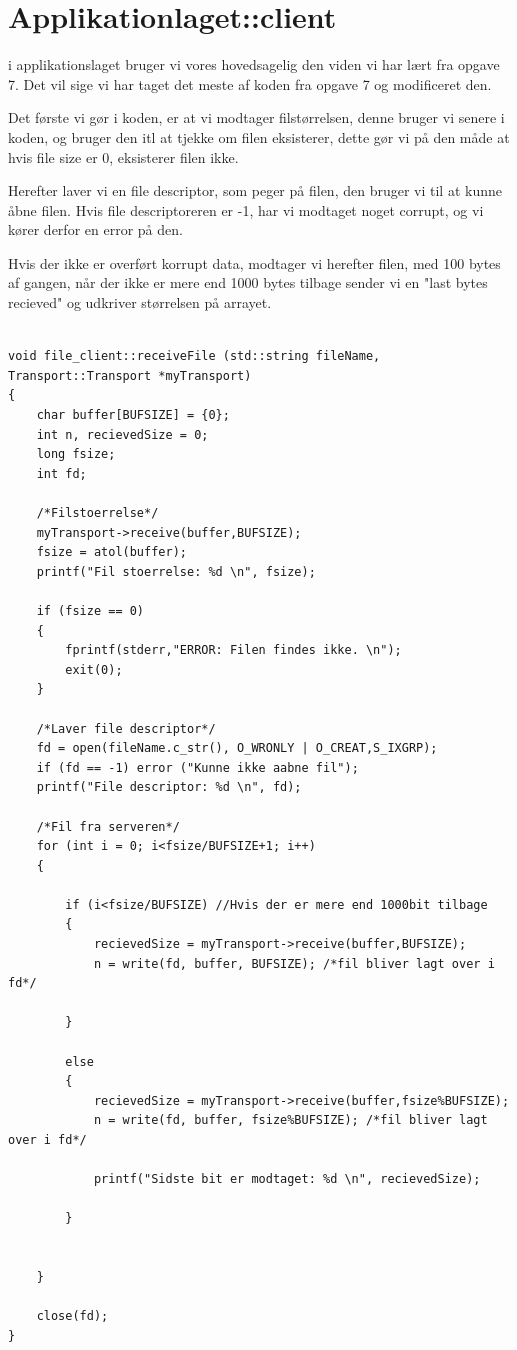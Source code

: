 \graphicspath{{Chapters/Veroboardmontering/}}

\chapter{Applikationlaget::client}

i applikationslaget bruger vi vores hovedsagelig den viden vi har lært fra opgave 7. Det vil sige vi har taget det meste af koden fra opgave 7 og modificeret den. 

Det første vi gør i koden, er at vi modtager filstørrelsen, denne bruger vi senere i koden, og bruger den itl at tjekke om filen eksisterer, dette gør vi på den måde at hvis file size er 0, eksisterer filen ikke. 

Herefter laver vi en file descriptor, som peger på filen, den bruger vi til at kunne åbne filen. Hvis file descriptoreren er -1, har vi modtaget noget corrupt, og vi kører derfor en error på den. 

Hvis der ikke er overført korrupt data, modtager vi herefter filen, med 100 bytes af gangen, når der ikke er mere end 1000 bytes tilbage sender vi en "last bytes recieved" og udkriver størrelsen på arrayet. 

\begin{lstlisting}[frame=single]  % Start your code-block

void file_client::receiveFile (std::string fileName, Transport::Transport *myTransport)
{
    char buffer[BUFSIZE] = {0};
    int n, recievedSize = 0;
    long fsize;
    int fd;

    /*Filstoerrelse*/
    myTransport->receive(buffer,BUFSIZE);
    fsize = atol(buffer);
    printf("Fil stoerrelse: %d \n", fsize);

    if (fsize == 0)
    {
        fprintf(stderr,"ERROR: Filen findes ikke. \n");
        exit(0);
    }

    /*Laver file descriptor*/
    fd = open(fileName.c_str(), O_WRONLY | O_CREAT,S_IXGRP);
    if (fd == -1) error ("Kunne ikke aabne fil");
    printf("File descriptor: %d \n", fd);

    /*Fil fra serveren*/
    for (int i = 0; i<fsize/BUFSIZE+1; i++)
    {

        if (i<fsize/BUFSIZE) //Hvis der er mere end 1000bit tilbage
        {
            recievedSize = myTransport->receive(buffer,BUFSIZE);
            n = write(fd, buffer, BUFSIZE); /*fil bliver lagt over i fd*/

        }

        else
        {
            recievedSize = myTransport->receive(buffer,fsize%BUFSIZE);
            n = write(fd, buffer, fsize%BUFSIZE); /*fil bliver lagt over i fd*/

            printf("Sidste bit er modtaget: %d \n", recievedSize);

        }


    }

    close(fd);
}

\end{lstlisting}	


